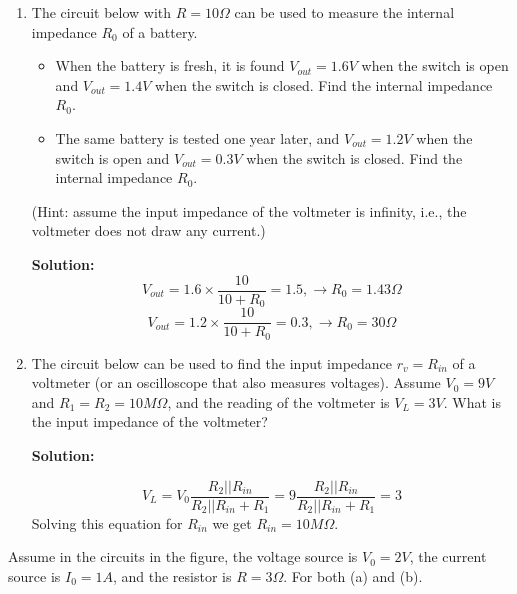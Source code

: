 \begin{enumerate}

  {\bf Solution:}

  (a) When $R_L=100 \Omega$, 
  \[V_L=V_0 \frac{R_L}{R_L+r_0}=10 \frac{100}{100+10}=9 V \]

  (b) $R_L=10K\Omage$.
  \[V_L=V_0 \frac{R_L}{R_L+r_0}=10 \frac{10000}{10000+10}=9.99 V \]

  (c) To maximize $V_L$, we want maximize $R_L$ and minimize $R_0$.

\item The circuit below with $R=10 \Omega$ can be used to measure the internal 
  impedance $R_0$ of a battery.
  \begin{itemize}
    \item When the battery is fresh, it is found $V_{out}=1.6V$ when the switch is open 
      and $V_{out}=1.4V$ when the switch is closed. Find the internal impedance $R_0$.
    \item The same battery is tested one year later, and $V_{out}=1.2V$ when the switch 
      is open and $V_{out}=0.3V$ when the switch is closed. Find the internal impedance 
      $R_0$.
  \end{itemize}
(Hint: assume the input impedance of the voltmeter is infinity, i.e., the voltmeter
  does not draw any current.)


{\bf Solution:}
\[ V_{out}=1.6\times \frac{10}{10+R_0}=1.5, \longrightarrow R_0=1.43 \Omega \]
\[ V_{out}=1.2\times \frac{10}{10+R_0}=0.3, \longrightarrow R_0=30 \Omega \]

\item The circuit below can be used to find the input impedance $r_v=R_{in}$ of
  a voltmeter (or an oscilloscope that also measures voltages). Assume $V_0=9V$
  and $R_1=R_2=10 M\Omega$, and the reading of the voltmeter is $V_L=3V$. 
  What is the input impedance of the voltmeter?
  

  {\bf Solution:}

  \[ V_L=V_0\frac{R_2||R_{in}}{R_2||R_{in}+R_1}
  =9 \frac{R_2 || R_{in}}{R_2 || R_{in}+R_1}=3 \]
  Solving this equation for $R_{in}$ we get $R_{in}=10 M\Omega$.


\end{enumerate}



\item Assume in the circuits in the figure, the voltage source is $V_0=2V$,
	the current source is $I_0=1A$, and the resistor is $R=3\Omega$.
	For both (a) and (b).

